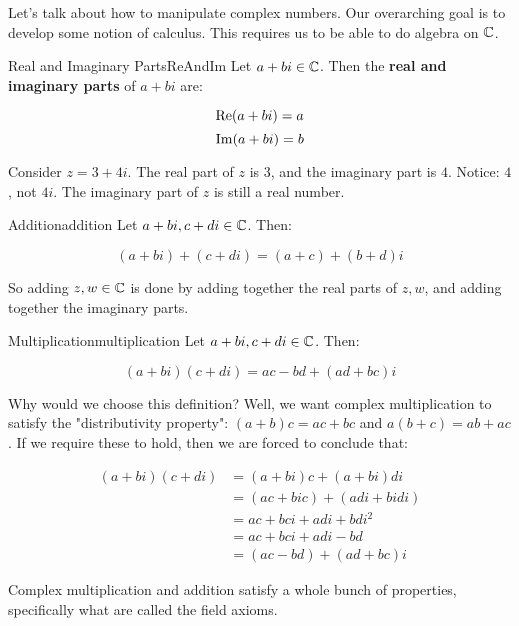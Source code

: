 Let's talk about how to manipulate complex numbers. Our overarching goal is to develop some notion of calculus. This requires us to be able to do algebra on $\mathbb{C}$.

\begin{defbo}{Real and Imaginary Parts}{ReAndIm} 
Let $a+ bi\in \mathbb{C}$. Then the {\bf real and imaginary parts} of $a+bi$ are:

$$\operatorname{Re}(a+bi) = a$$
$$\operatorname{Im}(a+bi) = b$$
\end{defbo}

\begin{ex}{}{} Consider $z = 3 + 4i$. The real part of $z$ is $3$, and the imaginary part is $4$. Notice: $4$, not $4i$. The imaginary part of $z$ is still a real number.
\end{ex}


\begin{defbo}{Addition}{addition}
 Let $a+bi, c+di \in \mathbb{C}$. Then:

$$(a+bi) + (c+di) = (a+c) + (b+d)i$$
\end{defbo}

So adding $z,w \in \mathbb{C}$ is done by adding together the real parts of $z,w$, and adding together the imaginary parts.

\begin{defbo}{Multiplication}{multiplication} 
Let $a + bi, c+di \in \mathbb{C}$. Then:

$$(a+bi)(c+di) = ac - bd + (ad + bc)i$$
\end{defbo}

Why would we choose this definition? Well, we want complex multiplication to satisfy the "distributivity property": $(a+b)c = ac+bc$ and $a(b+c) = ab + ac$. If we require these to hold, then we are forced to conclude that:

\begin{align*}(a+bi)(c+di) &= (a+bi)c + (a+bi)di\\
&= (ac + bic) + (adi + bidi)\\
&= ac + bci + adi + bdi^2\\
&= ac + bci + adi - bd\\
&= (ac -bd) + (ad + bc)i
\end{align*}

Complex multiplication and addition satisfy a whole bunch of properties, specifically what are called the field axioms.


